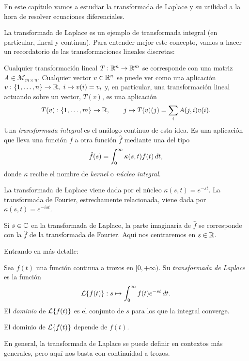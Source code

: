\documentclass[../ecuaciones_diferenciales.tex]{subfiles}
\begin{document}
En este capítulo vamos a estudiar la transformada de Laplace y su utilidad a la
hora de resolver ecuaciones diferenciales.

La transformada de Laplace es un ejemplo de transformada integral (en
particular, lineal y continua). Para entender mejor este concepto, vamos a
hacer un recordatorio de las transformaciones lineales discretas:

Cualquier transformación lineal \(T : \mathbb{R}^n \to \mathbb{R}^m\) se corresponde con una
matriz \(A \in \mathcal{M}_{m \times n}\). Cualquier vector \(v \in \mathbb{R}^n\) se
puede ver como una aplicación
\(v : \{1, \dots, n\} \to \mathbb{R},\ i \mapsto v(i) = v_i\) y, en particular, una
transformación lineal actuando sobre un vector, \(T(v)\), es una aplicación
\[T(v) : \{1, \dots, m\} \to \mathbb{R}, \qquad j \mapsto T(v)(j) = \sum_i A(j,i)v(i).\]
Una \emph{transformada integral} es el análogo continuo de esta idea. Es una
aplicación que lleva una función \(f\) a otra función \(\hat{f}\) mediante una
 del tipo
\[\hat{f}(s) = \int_0^\infty \kappa(s,t) f(t) \mathop{d\!} t,\]
donde \(\kappa\) recibe el nombre de \emph{kernel} o \emph{núcleo integral}.

La transformada de Laplace viene dada por el núcleo \(\kappa(s,t) =
e^{-st}\). La transformada de Fourier, estrechamente relacionada, viene dada por
\(\kappa(s,t) = e^{-ist}\).

\begin{remark}
	Si \(s \in \mathbb{C}\) en la transformada de Laplace, la parte imaginaria de
	\(\hat{f}\) se corresponde con la \(\hat{f}\) de la transformada de
	Fourier. Aquí nos centraremos en \(s \in \mathbb{R}\).
\end{remark}

Entrando en más detalle:

\begin{definition}
	Sea \(f(t)\) una función continua a trozos en \([0,+\infty)\). Su
	\emph{transformada de Laplace} es la función
	\[\operatorname{\mathcal{L}}\{f(t)\} : s \mapsto \int_0^\infty f(t)e^{-st} \mathop{d\!} t.\]
	El \emph{dominio} de \(\operatorname{\mathcal{L}}\{f(t)\}\) es el conjunto de \(s\) para los que la
	integral converge.
\end{definition}

\begin{remark}
	El dominio de \(\operatorname{\mathcal{L}}\{f(t)\}\) depende de \(f(t)\).
\end{remark}

\begin{remark}
	En general, la transformada de Laplace se puede definir en contextos más
	generales, pero aquí nos basta con continuidad a trozos.
\end{remark}
\end{document}
